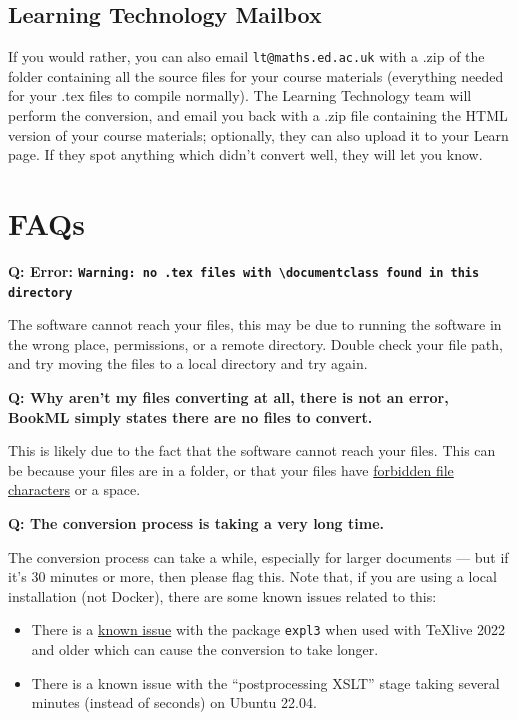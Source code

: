 \subsection{Learning Technology Mailbox}
\label{ssec:lt}

If you would rather, you can also email \verb|lt@maths.ed.ac.uk| with a .zip of the folder containing all the source files for your course materials (everything needed for your .tex files to compile normally). The Learning Technology team will perform the conversion, and email you back with a .zip file containing the HTML version of your course materials; optionally, they can also upload it to your Learn page. If they spot anything which didn't convert well, they will let you know.


\section{FAQs}
\label{sec:FAQ}

\noindent\textbf{Q: Error: \texttt{Warning: no .tex files with \textbackslash{}documentclass found in this directory}}
\begin{ans}
    The software cannot reach your files, this may be due to running the software in the wrong place, permissions, or a remote directory. 
    Double check your file path, and try moving the files to a local directory and try again.
\end{ans}

\noindent\textbf{Q: Why aren't my files converting at all, there is not an error, BookML simply states there are no files to convert.} 
\begin{ans}
    This is likely due to the fact that the software cannot reach your files. This can be because your files are in a folder, or that your files have \href{https://stackoverflow.com/questions/1976007/what-characters-are-forbidden-in-windows-and-linux-directory-names}{forbidden file characters} or a space.
\end{ans}

\noindent\textbf{Q: The conversion process is taking a very long time.}
\begin{ans}
    The conversion process can take a while, especially for larger documents --- but if it's 30 minutes or more, then please flag this. Note that, if you are using a local installation (not Docker), there are some known issues related to this:
    \begin{itemize}
        \item There is a \href{https://github.com/brucemiller/LaTeXML/issues/2268}{known issue} with the package \verb|expl3| when used with TeXlive 2022 and older which can cause the conversion to take longer.
        \item There is a known issue with the ``postprocessing XSLT'' stage taking several minutes (instead of seconds) on Ubuntu 22.04.
    \end{itemize}
\end{ans}
 
